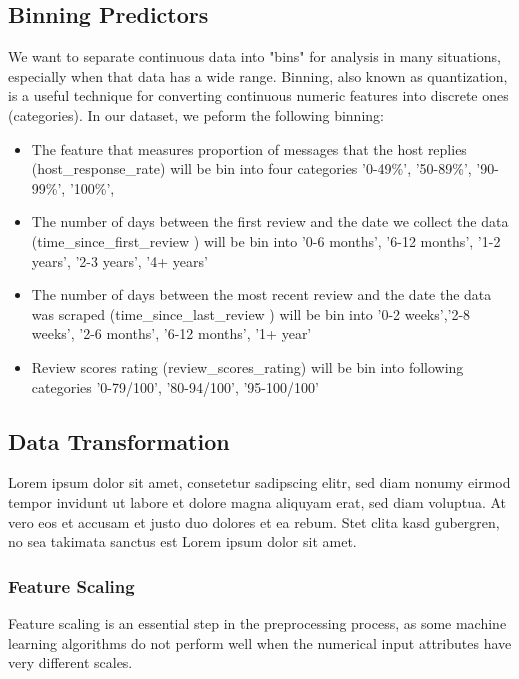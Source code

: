 \subsection{Binning Predictors}

We want to separate continuous data into "bins" for analysis in many situations, especially when that data has a wide range.
Binning, also known as quantization, is a useful technique for converting continuous numeric features into discrete ones (categories).
In our dataset, we peform the following binning:
\begin{itemize}

    \item The feature that measures proportion of messages that the host replies
(host\_response\_rate) will be bin into four categories '0-49\%', '50-89\%',
'90-99\%', '100\%',

    \item The number of days between the first review and the date we collect the data
    (time\_since\_first\_review ) will be bin into '0-6 months', '6-12 months', '1-2
    years', '2-3 years', '4+ years'

    \item The number of days between the most recent review and the date the data was
    scraped (time\_since\_last\_review ) will be bin into '0-2 weeks','2-8 weeks',
    '2-6 months', '6-12 months', '1+ year'

    \item Review scores rating (review\_scores\_rating) will be bin into following
    categories '0-79/100', '80-94/100', '95-100/100'
\end{itemize}



\subsection{Data Transformation}

Lorem ipsum dolor sit amet, consetetur sadipscing elitr, sed diam nonumy eirmod
tempor invidunt ut labore et dolore magna aliquyam erat, sed diam voluptua. At
vero eos et accusam et justo duo dolores et ea rebum. Stet clita kasd gubergren,
no sea takimata sanctus est Lorem ipsum dolor sit amet.

\subsubsection{Feature Scaling}

Feature scaling is an essential step in the preprocessing process, as some
machine learning algorithms do not perform well when the numerical input
attributes have very different scales.

